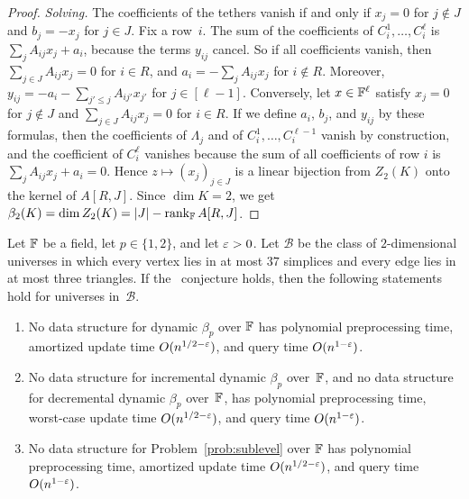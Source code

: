 \begin{proof}
\emph{Solving.}
The coefficients of the tethers vanish if and only if $x_j=0$ for $j\notin J$ and $b_j=-x_j$ for $j\in J$.
Fix a row~$i$.
The sum of the coefficients of $C_i^1,\dots,C_i^{\ell}$ is $\sum_{j}A_{ij}x_j+a_i$, because the terms $y_{ij}$ cancel.
So if all coefficients vanish, then $\sum_{j\in J}A_{ij}x_j=0$ for $i\in R$, and $a_i=-\sum_{j}A_{ij}x_j$ for $i\notin R$.
Moreover, $y_{ij}=-a_i-\sum_{j'\le j}A_{ij'}x_{j'}$ for $j\in[\ell-1]$.
Conversely, let $x\in\mathbb{F}^{\ell}$ satisfy $x_j=0$ for $j\notin J$ and $\sum_{j\in J}A_{ij}x_j=0$ for $i\in R$.
If we define $a_i$, $b_j$, and $y_{ij}$ by these formulas, then the coefficients of $\Lambda_j$ and of $C_i^1,\dots,C_i^{\ell-1}$ vanish by construction, and the coefficient of $C_i^{\ell}$ vanishes because the sum of all coefficients of row $i$ is $\sum_{j}A_{ij}x_j+a_i=0$.
Hence $z\mapsto(x_j)_{j\in J}$ is a linear bijection from $Z_2(K)$ onto the kernel of $A[R,J]$.
Since $\dim K=2$, we get $\beta_2(K)=\dim Z_2(K)=|J|-\operatorname{rank}_{\mathbb{F}}A[R,J]$.
\end{proof}

\begin{theorem}\label{thm:bdeg}\label{thm:bounded-degree}
Let $\mathbb{F}$ be a field, let $p\in\{1,2\}$, and let $\varepsilon>0$.
Let $\mathcal{B}$ be the class of $2$-dimensional universes in which every vertex lies in at most $37$ simplices and every edge lies in at most three triangles.
If the \OMv\ conjecture holds, then the following statements hold for universes in~$\mathcal{B}$.
\begin{enumerate}[label=(\roman*)]
\item No data structure for dynamic $\beta_p$ over $\mathbb{F}$ has polynomial preprocessing time, amortized update time $O(n^{1/2-\varepsilon})$, and query time $O(n^{1-\varepsilon})$.
\item No data structure for incremental dynamic $\beta_p$ over~$\mathbb{F}$, and no data structure for decremental dynamic $\beta_p$ over~$\mathbb{F}$, has polynomial preprocessing time, worst-case update time $O(n^{1/2-\varepsilon})$, and query time $O(n^{1-\varepsilon})$.
\item No data structure for Problem~\ref{prob:sublevel} over $\mathbb{F}$ has polynomial preprocessing time, amortized update time $O(n^{1/2-\varepsilon})$, and query time $O(n^{1-\varepsilon})$.
\end{enumerate}
\end{theorem}

